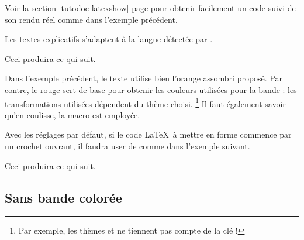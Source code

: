 \begin{tdocrem}
    Voir la section \ref{tutodoc-latexshow} page \pageref{tutodoc-latexshow} pour obtenir facilement un code suivi de son rendu réel comme dans l'exemple précédent.
\end{tdocrem}


\begin{tdocnote}
    Les textes explicatifs s'adaptent à la langue détectée par \thisproj.
\end{tdocnote}


\begin{tdocexa}
    \leavevmode



    Ceci produira ce qui suit.

    \medskip

    

\end{tdocexa}


\begin{tdocnote}
    Dans l'exemple précédent, le texte utilise bien l'orange assombri proposé. Par contre, le rouge sert de base pour obtenir les couleurs utilisées pour la bande : les transformations utilisées dépendent du thème choisi.%
    \footnote{
        Par exemple, les thèmes  et  ne tiennent pas compte de la clé  !
    }
    Il faut également savoir qu'en coulisse, la macro  est employée.

    \begin{tdoclatex}[std]
    \end{tdoclatex}
\end{tdocnote}


\begin{tdocwarn}
    Avec les réglages par défaut, si le code \LaTeX\ à mettre en forme commence par un crochet ouvrant, il faudra user de  comme dans l'exemple suivant.



    Ceci produira ce qui suit.
\end{tdocwarn}





\subsection{Sans bande colorée}

